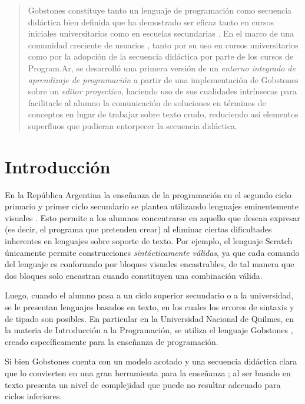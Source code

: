 \begin{abstract}
Gobstones constituye tanto un lenguaje de programación como secuencia didáctica bien definida que ha demostrado ser eficaz tanto en cursos iniciales universitarios como en escuelas secundarias \cite{CuadernoDocenteProgramAR}. En el marco de una comunidad creciente de usuarios \cite{CuadernoDocenteProgramAR}, tanto por su uso en cursos universitarios como por la adopción de la secuencia didáctica por parte de los cursos de Program.Ar, se desarrolló una primera versión de un \emph{entorno integrado de aprendizaje de programación} a partir de una implementación de Gobstones sobre un \emph{editor proyectivo}, haciendo uso de sus cualidades intrínsecas para facilitarle al alumno la comunicación de soluciones en términos de conceptos en lugar de trabajar sobre texto crudo, reduciendo así elementos superfluos que pudieran entorpecer la secuencia didáctica.
\end{abstract}



\section{Introducción} \label{intro}

En la República Argentina la enseñanza de la programación en el segundo ciclo primario y primer ciclo secundario se plantea utilizando lenguajes eminentemente visuales \cite{CuadernoDocenteProgramAR}. Esto permite a los alumnos concentrarse en aquello que desean expresar (es decir, el programa que pretenden crear) al eliminar ciertas dificultades inherentes en lenguajes sobre soporte de texto. Por ejemplo, el lenguaje Scratch \cite{Maloney_scratch} únicamente permite construcciones \textit{sintácticamente válidas}, ya que cada comando del lenguaje es conformado por bloques visuales encastrables, de tal manera que dos bloques solo encastran cuando constituyen una combinación válida.

Luego, cuando el alumno pasa a un ciclo superior secundario o a la universidad, se le presentan lenguajes basados en texto, en los cuales los errores de sintaxis y de tipado son posibles. En particular en la Universidad Nacional de Quilmes, en la materia de Introducción a la Programación, se utiliza el lenguaje Gobstones \cite{Gobstones}, creado específicamente para la enseñanza de programación.

Si bien Gobstones cuenta con un modelo acotado y una secuencia didáctica clara que lo convierten en una gran herramienta para la enseñanza ; al ser basado en texto presenta un nivel de complejidad que puede no resultar adecuado para ciclos inferiores.

